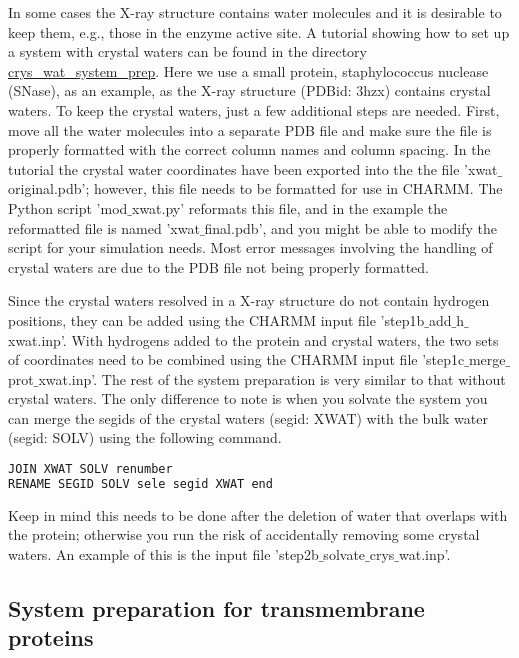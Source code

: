 In some cases the X-ray structure contains water molecules and it is desirable to keep them, e.g., those in the enzyme active site.
A tutorial showing how to set up a system with crystal waters can be
found in the directory \href{https://gitlab.com/shenlab-amber-cphmd/cphmd-tutorial/-/tree/main/hphmd_charmm/crys_wat_system_prep}{crys\_wat\_system\_prep}.
Here we use a small protein, staphylococcus nuclease (SNase), as an example,
as the X-ray structure (PDBid: 3hzx) contains crystal waters.
To keep the crystal waters, just a few additional steps are needed.
First, move all the water molecules into a separate PDB file and make sure the file is properly formatted with the correct column names and column spacing.
In the tutorial the crystal water coordinates have been exported into the the file 'xwat$\_$original.pdb'; however, this file needs to be formatted for use in CHARMM. 
The Python script 'mod$\_$xwat.py' reformats this file, and in the example the reformatted file is named 'xwat$\_$final.pdb', and you might be able to modify the script for your simulation needs.
Most error messages involving the handling of crystal waters are due to the PDB file not being properly formatted. 

Since the crystal waters resolved in a X-ray structure do not contain hydrogen positions, they can be added using the CHARMM input file 'step1b$\_$add$\_$h$\_$xwat.inp'.
With hydrogens added to the protein and crystal waters, the two sets of coordinates need to be combined using the CHARMM input file 'step1c$\_$merge$\_$prot$\_$xwat.inp'.
The rest of the system preparation is very similar to
that without crystal waters.
The only difference to note is when you solvate the system you can merge the segids of the crystal waters (segid: XWAT) with the bulk water (segid: SOLV) using the following command.
%
\begin{lstlisting}[language=bash]
JOIN XWAT SOLV renumber
RENAME SEGID SOLV sele segid XWAT end
\end{lstlisting}
%
Keep in mind this needs to be done after the deletion of water that overlaps with the protein; otherwise you run the risk of accidentally removing some crystal waters.
An example of this is the input file 'step2b$\_$solvate$\_$crys$\_$wat.inp'.


\subsection{System preparation for transmembrane proteins}

